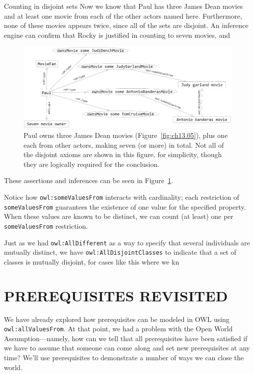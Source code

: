 \begin{challenge}{Counting in disjoint sets}
Now we know that Paul has three James Dean movies and at least one movie
from each of the other actors named here. Furthermore, none of these
movies appears twice, since all of the sets are disjoint. An inference
engine can confirm that Rocky is justified in counting to seven movies,
and

\begin{figure}
\centering
\includegraphics[width=5in]{SWWOv3/media/ch13/figure13-6.png}
\caption{Paul owns three James Dean movies (Figure~\ref{fig:ch13.05}), plus one each from
other actors, making seven (or more) in total.  Not all of the disjoint axioms are shown in this figure, for simplicity, though they are logically required for the conclusion.}
\label{fig:ch13.06}
\end{figure}


These assertions and inferences can be seen in Figure~\ref{fig:ch13.06}.
\end{challenge}


Notice how \texttt{owl:someValuesFrom} interacts with cardinality; each
restriction of \texttt{someValuesFrom} guarantees the existence of one value for
the specified property. When these values are known to be distinct, we
can count (at least) one per \texttt{someValuesFrom} restriction.

Just as we had \texttt{owl:AllDifferent} as a way to specify that several
individuals are mutually distinct, we have \texttt{owl:AllDisjointClasses} to indicate that a set of classes is mutually disjoint, for cases like this where we kn



\section{PREREQUISITES REVISITED}

We have already explored how prerequisites can be modeled in OWL using
\texttt{owl:allValuesFrom}. At that point, we had a problem with the Open World
Assumption---namely, how can we tell that all prerequisites have been
satisfied if we have to assume that someone can come along and set new
prerequisites at any time? We'll use prerequisites to demonstrate a
number of ways we can close the world.

